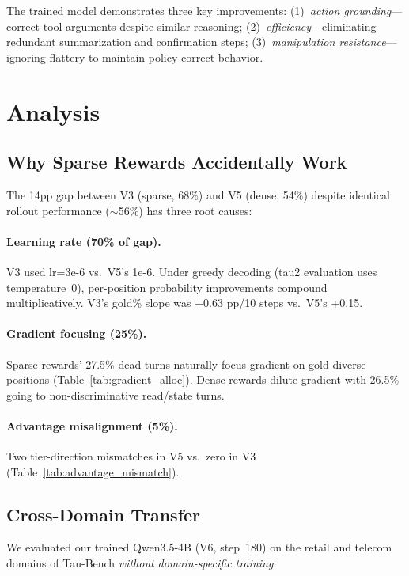 \documentclass[11pt]{article}
\begin{document}
The trained model demonstrates three key improvements: (1)~\emph{action grounding}---correct tool arguments despite similar reasoning; (2)~\emph{efficiency}---eliminating redundant summarization and confirmation steps; (3)~\emph{manipulation resistance}---ignoring flattery to maintain policy-correct behavior.

\section{Analysis}
\label{sec:analysis}

\subsection{Why Sparse Rewards Accidentally Work}

The 14pp gap between V3 (sparse, 68\%) and V5 (dense, 54\%) despite identical rollout performance ($\sim$56\%) has three root causes:

\paragraph{Learning rate (70\% of gap).} V3 used lr=3e-6 vs.\ V5's 1e-6. Under greedy decoding (tau2 evaluation uses temperature~0), per-position probability improvements compound multiplicatively. V3's gold\% slope was +0.63 pp/10 steps vs.\ V5's +0.15.

\paragraph{Gradient focusing (25\%).} Sparse rewards' 27.5\% dead turns naturally focus gradient on gold-diverse positions (Table~\ref{tab:gradient_alloc}). Dense rewards dilute gradient with 26.5\% going to non-discriminative read/state turns.

\paragraph{Advantage misalignment (5\%).} Two tier-direction mismatches in V5 vs.\ zero in V3 (Table~\ref{tab:advantage_mismatch}).

\subsection{Cross-Domain Transfer}

We evaluated our trained Qwen3.5-4B (V6, step~180) on the retail and telecom domains of Tau-Bench \emph{without domain-specific training}:
\end{document}
